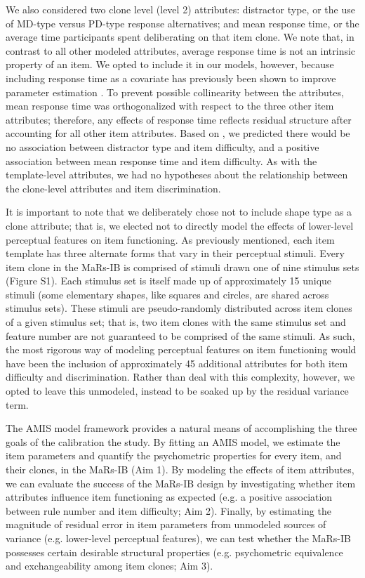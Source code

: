 \documentclass[a4paper,man,natbib]{apa6}
\begin{document}
We also considered two clone level (level 2) attributes: distractor type, or the use of MD-type versus PD-type response alternatives; and mean response time, or the average time participants spent deliberating on that item clone. We note that, in contrast to all other modeled attributes, average response time is not an intrinsic property of an item. We opted to include it in our models, however, because including response time as a covariate has previously been shown to improve parameter estimation \citep{bertling2018using}. To prevent possible collinearity between the attributes, mean response time was orthogonalized with respect to the three other item attributes; therefore, any effects of response time reflects residual structure after accounting for all other item attributes. Based on \cite{chierchia2019matrix}, we predicted there would be no association between distractor type and item difficulty, and a positive association between mean response time and item difficulty. As with the template-level attributes, we had no hypotheses about the relationship between the clone-level attributes and item discrimination. 

It is important to note that we deliberately chose not to include shape type as a clone attribute; that is, we elected not to directly model the effects of lower-level perceptual features on item functioning. As previously mentioned, each item template has three alternate forms that vary in their perceptual stimuli. Every item clone in the MaRs-IB is comprised of stimuli drawn one of nine stimulus sets (Figure S1). Each stimulus set is itself made up of approximately 15 unique stimuli (some elementary shapes, like squares and circles, are shared across stimulus sets). These stimuli are pseudo-randomly distributed across item clones of a given stimulus set; that is, two item clones with the same stimulus set and feature number are not guaranteed to be comprised of the same stimuli. As such, the most rigorous way of modeling perceptual features on item functioning would have been the inclusion of approximately 45 additional attributes for both item difficulty and discrimination. Rather than deal with this complexity, however, we opted to leave this unmodeled, instead to be soaked up by the residual variance term. 

The AMIS model framework provides a natural means of accomplishing the three goals of the calibration the study. By fitting an AMIS model, we estimate the item parameters and quantify the psychometric properties for every item, and their clones, in the MaRs-IB (Aim 1). By modeling the effects of item attributes, we can evaluate the success of the MaRs-IB design by investigating whether item attributes influence item functioning as expected (e.g. a positive association between rule number and item difficulty; Aim 2). Finally, by estimating the magnitude of residual error in item parameters from unmodeled sources of variance (e.g. lower-level perceptual features), we can test whether the MaRs-IB possesses certain desirable structural properties (e.g. psychometric equivalence and exchangeability among item clones; Aim 3). 
\end{document}
